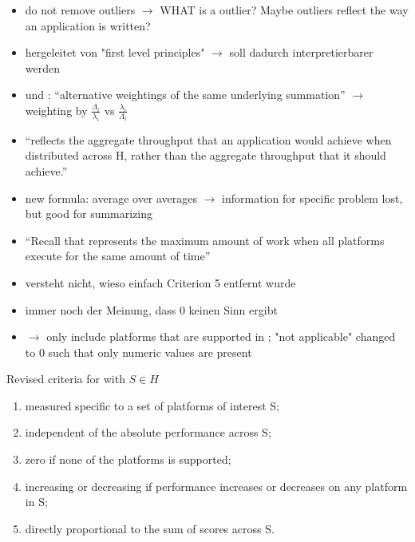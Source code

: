 \begin{itemize}
    \item do not remove outliers $\rightarrow$ WHAT is a outlier? Maybe outliers reflect the way an application is written?
    \item hergeleitet von "first level principles" $\rightarrow$ \pp soll dadurch interpretierbarer werden
    \item \pp und \mpp: \enquote{alternative weightings of the same underlying summation} $\rightarrow$ weighting by $\frac{\Lambda_i}{\lambda_i}$  vs $\frac{\lambda_i}{\Lambda_i}$
    \item \enquote{\mpp reflects the aggregate throughput that an application would achieve when distributed across H, rather than the aggregate throughput that it should achieve.}
    \item new formula: average over averages $\rightarrow$ information for specific problem lost, but good for summarizing
    \item \enquote{Recall that \pp represents the maximum amount of work when all platforms execute for the same amount of time}
\end{itemize}



\newpage
\cite{marowka_comparison_2023}

\begin{itemize}
    \item versteht nicht, wieso einfach Criterion 5 entfernt wurde
    \item immer noch der Meinung, dass $0$ keinen Sinn ergibt
    \item $\rightarrow$ only include platforms that are supported in \mpp; "not applicable" changed to $0$ such that only numeric values are present
\end{itemize}

Revised criteria for \mpp with $S \in H$
\begin{enumerate}
    \item measured specific to a set of platforms of interest S;
    \item independent of the absolute performance across S;
    \item zero if none of the platforms is supported;
    \item increasing or decreasing if performance increases or decreases on any platform in S;
    \item directly proportional to the sum of scores across S.
\end{enumerate}


